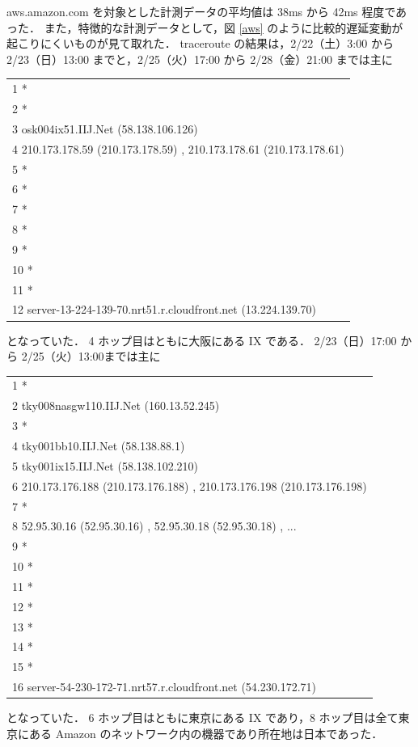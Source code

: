 \documentclass[a4j]{jarticle}
\begin{document}
aws.amazon.com を対象とした計測データの平均値は 38ms から 42ms 程度であった．
また，特徴的な計測データとして，図 \ref{aws} のように比較的遅延変動が起こりにくいものが見て取れた．
traceroute の結果は，2/22（土）3:00 から 2/23（日）13:00 までと，2/25（火）17:00 から 2/28（金）21:00 までは主に
\begin{table}[H]
\centering
\begin{tabular}{l}
 1  *\\
 2  *\\
 3  osk004ix51.IIJ.Net (58.138.106.126)\\
 4  210.173.178.59 (210.173.178.59) , 210.173.178.61 (210.173.178.61)\\
 5  *\\
 6  *\\
 7  *\\
 8  *\\
 9  *\\
10  *\\
11  *\\
12  server-13-224-139-70.nrt51.r.cloudfront.net (13.224.139.70)\\
\end{tabular}
\end{table}
となっていた．
4 ホップ目はともに大阪にある IX である．
2/23（日）17:00 から 2/25（火）13:00までは主に
\begin{table}[H]
\centering
\begin{tabular}{l}
 1  *\\
 2  tky008nasgw110.IIJ.Net (160.13.52.245)\\
 3  *\\
 4  tky001bb10.IIJ.Net (58.138.88.1)\\
 5  tky001ix15.IIJ.Net (58.138.102.210)\\
 6  210.173.176.188 (210.173.176.188) , 210.173.176.198 (210.173.176.198)\\
 7  *\\
 8  52.95.30.16 (52.95.30.16) , 52.95.30.18 (52.95.30.18) , ...\\
 9  *\\
10  *\\
11  *\\
12  *\\
13  *\\
14  *\\
15  *\\
16  server-54-230-172-71.nrt57.r.cloudfront.net (54.230.172.71)\\
\end{tabular}
\end{table}
となっていた．
6 ホップ目はともに東京にある IX であり，8 ホップ目は全て東京にある Amazon のネットワーク内の機器であり所在地は日本であった．
\end{document}
